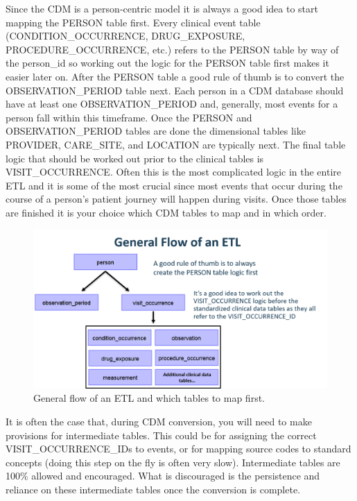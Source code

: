 \documentclass[11pt]{book}
\theoremstyle{definition}
\theoremstyle{definition}
\theoremstyle{definition}
\theoremstyle{remark}
\begin{document}
Since the CDM is a person-centric model it is always a good idea to
start mapping the PERSON table first. Every clinical event table
(CONDITION\_OCCURRENCE, DRUG\_EXPOSURE, PROCEDURE\_OCCURRENCE, etc.)
refers to the PERSON table by way of the person\_id so working out the
logic for the PERSON table first makes it easier later on. After the
PERSON table a good rule of thumb is to convert the OBSERVATION\_PERIOD
table next. Each person in a CDM database should have at least one
OBSERVATION\_PERIOD and, generally, most events for a person fall within
this timeframe. Once the PERSON and OBSERVATION\_PERIOD tables are done
the dimensional tables like PROVIDER, CARE\_SITE, and LOCATION are
typically next. The final table logic that should be worked out prior to
the clinical tables is VISIT\_OCCURRENCE. Often this is the most
complicated logic in the entire ETL and it is some of the most crucial
since most events that occur during the course of a person's patient
journey will happen during visits. Once those tables are finished it is
your choice which CDM tables to map and in which order.

\begin{figure}

{\centering \includegraphics[width=1\linewidth]{images/ExtractTransformLoad/flowOfEtl} 

}

\caption{General flow of an ETL and which tables to map first.}\label{fig:etlFlow}
\end{figure}

It is often the case that, during CDM conversion, you will need to make
provisions for intermediate tables. This could be for assigning the
correct VISIT\_OCCURRENCE\_IDs to events, or for mapping source codes to
standard concepts (doing this step on the fly is often very slow).
Intermediate tables are 100\% allowed and encouraged. What is
discouraged is the persistence and reliance on these intermediate tables
once the conversion is complete.
\end{document}
